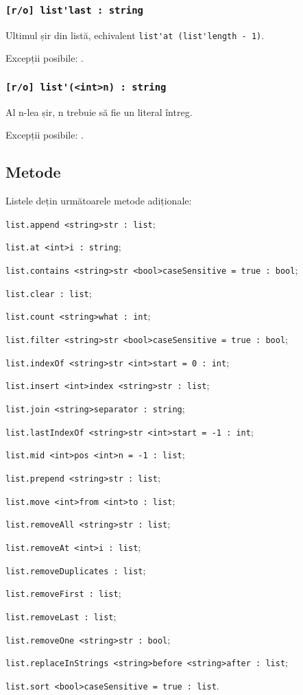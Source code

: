\subsubsection{\lstinline|[r/o] list'last : string|}

Ultimul șir din listă, echivalent \lstinline|list'at (list'length - 1)|.

Excepții posibile: .

\subsubsection{\lstinline|[r/o] list'(<int>n) : string|}

Al n-lea șir, n trebuie să fie un literal întreg.

Excepții posibile: .

\subsection{Metode}

Listele dețin următoarele metode adiționale:
\begin{icItems}
\item \lstinline|list.append <string>str : list|;
\item \lstinline|list.at <int>i : string|;
\item \lstinline|list.contains <string>str <bool>caseSensitive = true : bool|;
\item \lstinline|list.clear : list|;
\item \lstinline|list.count <string>what : int|;
\item \lstinline|list.filter <string>str <bool>caseSensitive = true : bool|;
\item \lstinline|list.indexOf <string>str <int>start = 0 : int|;
\item \lstinline|list.insert <int>index <string>str : list|;
\item \lstinline|list.join <string>separator : string|;
\item \lstinline|list.lastIndexOf <string>str <int>start = -1 : int|;
\item \lstinline|list.mid <int>pos <int>n = -1 : list|;
\item \lstinline|list.prepend <string>str : list|;
\item \lstinline|list.move <int>from <int>to : list|;
\item \lstinline|list.removeAll <string>str : list|;
\item \lstinline|list.removeAt <int>i : list|;
\item \lstinline|list.removeDuplicates : list|;
\item \lstinline|list.removeFirst : list|;
\item \lstinline|list.removeLast : list|;
\item \lstinline|list.removeOne <string>str : bool|;
\item \lstinline|list.replaceInStrings <string>before <string>after : list|;
\item \lstinline|list.sort <bool>caseSensitive = true : list|.
\end{icItems}

